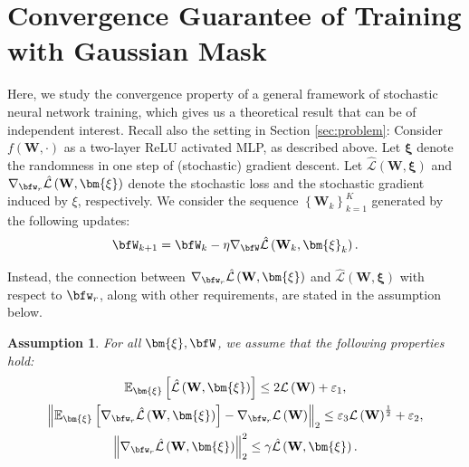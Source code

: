 \documentclass[10pt]{article} %
\theoremstyle{definition}
\theoremstyle{plain}
\newtheorem{assumption}[theorem]{Assumption}
\newcommand{\paren}[1]{\left(#1\right)}
\newcommand{\norm}[1]{\left\|#1\right\|}
\providecommand{\E}{\mathbb{E}}
\def\calL{{\mathcal{L}}}
\begin{document}
\section{Convergence Guarantee of Training with Gaussian Mask}
\label{sec:conv_guarantee}
Here, we study the convergence property of a general framework of stochastic neural network training, which gives us a theoretical result that can be of independent interest.
Recall also the setting in Section \ref{sec:problem}: Consider $f\paren{\mathbf{W},\cdot}$ as a two-layer ReLU activated MLP, as described above.
Let $\bm{\xi}$ denote the randomness in one step of (stochastic) gradient descent. 
Let $\hat{\calL}\paren{\mathbf{W},\bm{\xi}}$ and $\nabla_{\bfw_r}\hat{\calL}\paren{\mathbf{W},\bm{\xi}}$ denote the stochastic loss and the stochastic gradient induced by $\xi$, respectively. 
We consider the sequence $\left\{\mathbf{W}_k\right\}_{k=1}^K$ generated by the following updates:
\begin{equation}
    \label{eq:general_sgd}
    \bfW_{k+1} = \bfW_k - \eta\nabla_{\bfW}\hat{\calL}\paren{\mathbf{W}_k,\bm{\xi}_k}.
\end{equation}


Instead, the connection between $\nabla_{\bfw_r}\hat{\calL}\paren{\mathbf{W},\bm{\xi}}$ and $\hat{\calL}\paren{\mathbf{W},\bm{\xi}}$ with respect to $\bfw_r$, along with other requirements, are stated in the assumption below.

\begin{assumption}
    \label{asump:randomness}
    For all $\bm{\xi}, \bfW$, we assume that the following properties hold:
    \begin{gather}
        \label{eq:general_exp_loss_ub}
        \E_{\bm{\xi}}\left[\hat{\calL}\paren{\mathbf{W},\bm{\xi}}\right] \leq 2\calL\paren{\mathbf{W}}+ \varepsilon_1, \\
        \label{eq:general_exp_grad_err}
        \norm{\E_{\bm{\xi}}\left[\nabla_{\bfw_r}\hat{\calL}\paren{\mathbf{W},\bm{\xi}}\right] - \nabla_{\bfw_r}\calL\paren{\mathbf{W}}}_2 \leq \varepsilon_3\calL\paren{\mathbf{W}}^{\frac{1}{2}} + \varepsilon_2, \\
        \label{eq:general_smoothness}
        \norm{\nabla_{\bfw_r}\hat{\calL}\paren{\mathbf{W},\bm{\xi}}}_2^2 \leq \gamma\hat{\calL}\paren{\mathbf{W},\bm{\xi}}.
    \end{gather}
\end{assumption}
\end{document}

